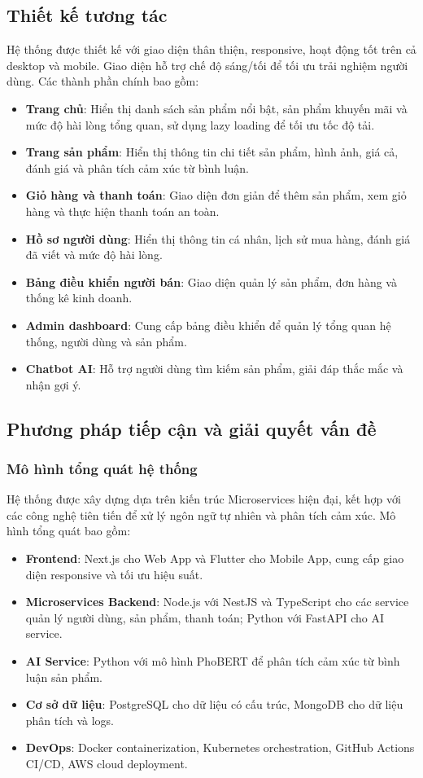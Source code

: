 \subsection{Thiết kế tương tác}
Hệ thống được thiết kế với giao diện thân thiện, responsive, hoạt động tốt trên cả desktop và mobile. Giao diện hỗ trợ chế độ sáng/tối để tối ưu trải nghiệm người dùng. Các thành phần chính bao gồm:
\begin{itemize}
    \item \textbf{Trang chủ}: Hiển thị danh sách sản phẩm nổi bật, sản phẩm khuyến mãi và mức độ hài lòng tổng quan, sử dụng lazy loading để tối ưu tốc độ tải.
    \item \textbf{Trang sản phẩm}: Hiển thị thông tin chi tiết sản phẩm, hình ảnh, giá cả, đánh giá và phân tích cảm xúc từ bình luận.
    \item \textbf{Giỏ hàng và thanh toán}: Giao diện đơn giản để thêm sản phẩm, xem giỏ hàng và thực hiện thanh toán an toàn.
    \item \textbf{Hồ sơ người dùng}: Hiển thị thông tin cá nhân, lịch sử mua hàng, đánh giá đã viết và mức độ hài lòng.
    \item \textbf{Bảng điều khiển người bán}: Giao diện quản lý sản phẩm, đơn hàng và thống kê kinh doanh.
    \item \textbf{Admin dashboard}: Cung cấp bảng điều khiển để quản lý tổng quan hệ thống, người dùng và sản phẩm.
    \item \textbf{Chatbot AI}: Hỗ trợ người dùng tìm kiếm sản phẩm, giải đáp thắc mắc và nhận gợi ý.
\end{itemize}

\subsection{Phương pháp tiếp cận và giải quyết vấn đề}
\subsubsection{Mô hình tổng quát hệ thống}
Hệ thống được xây dựng dựa trên kiến trúc Microservices hiện đại, kết hợp với các công nghệ tiên tiến để xử lý ngôn ngữ tự nhiên và phân tích cảm xúc. Mô hình tổng quát bao gồm:
\begin{itemize}
    \item \textbf{Frontend}: Next.js cho Web App và Flutter cho Mobile App, cung cấp giao diện responsive và tối ưu hiệu suất.
    \item \textbf{Microservices Backend}: Node.js với NestJS và TypeScript cho các service quản lý người dùng, sản phẩm, thanh toán; Python với FastAPI cho AI service.
    \item \textbf{AI Service}: Python với mô hình PhoBERT để phân tích cảm xúc từ bình luận sản phẩm.
    \item \textbf{Cơ sở dữ liệu}: PostgreSQL cho dữ liệu có cấu trúc, MongoDB cho dữ liệu phân tích và logs.
    \item \textbf{DevOps}: Docker containerization, Kubernetes orchestration, GitHub Actions CI/CD, AWS cloud deployment.
\end{itemize}

